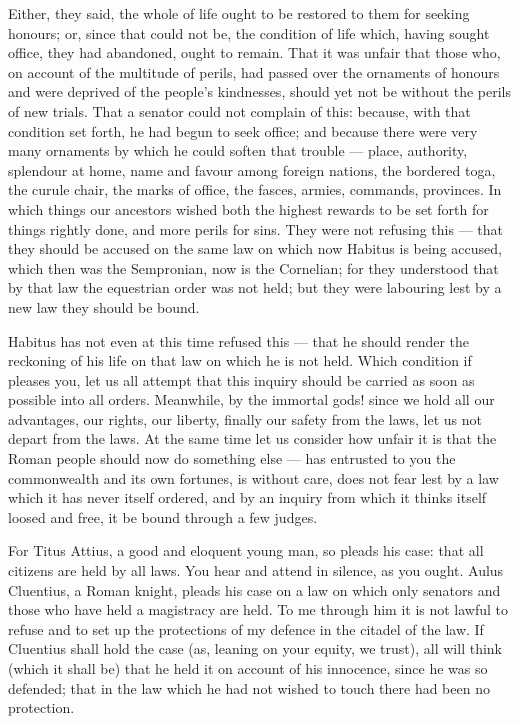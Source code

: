  Either, they said, the whole of life ought to be restored to them for seeking honours; or, since that could not be, the condition of life which, having sought office, they had abandoned, ought to remain. That it was unfair that those who, on account of the multitude of perils, had passed over the ornaments of honours and were deprived of the people's kindnesses, should yet not be without the perils of new trials. That a senator could not complain of this: because, with that condition set forth, he had begun to seek office; and because there were very many ornaments by which he could soften that trouble --- place, authority, splendour at home, name and favour among foreign nations, the bordered toga, the curule chair, the marks of office, the fasces, armies, commands, provinces. In which things our ancestors wished both the highest rewards to be set forth for things rightly done, and more perils for sins. They were not refusing this --- that they should be accused on the same law on which now Habitus is being accused, which then was the Sempronian, now is the Cornelian; for they understood that by that law the equestrian order was not held; but they were labouring lest by a new law they should be bound.

 Habitus has not even at this time refused this --- that he should render the reckoning of his life on that law on which he is not held. Which condition if pleases you, let us all attempt that this inquiry should be carried as soon as possible into all orders. Meanwhile, by the immortal gods! since we hold all our advantages, our rights, our liberty, finally our safety from the laws, let us not depart from the laws. At the same time let us consider how unfair it is that the Roman people should now do something else --- has entrusted to you the commonwealth and its own fortunes, is without care, does not fear lest by a law which it has never itself ordered, and by an inquiry from which it thinks itself loosed and free, it be bound through a few judges.

 For Titus Attius, a good and eloquent young man, so pleads his case: that all citizens are held by all laws. You hear and attend in silence, as you ought. Aulus Cluentius, a Roman knight, pleads his case on a law on which only senators and those who have held a magistracy are held. To me through him it is not lawful to refuse and to set up the protections of my defence in the citadel of the law. If Cluentius shall hold the case (as, leaning on your equity, we trust), all will think (which it shall be) that he held it on account of his innocence, since he was so defended; that in the law which he had not wished to touch there had been no protection.


